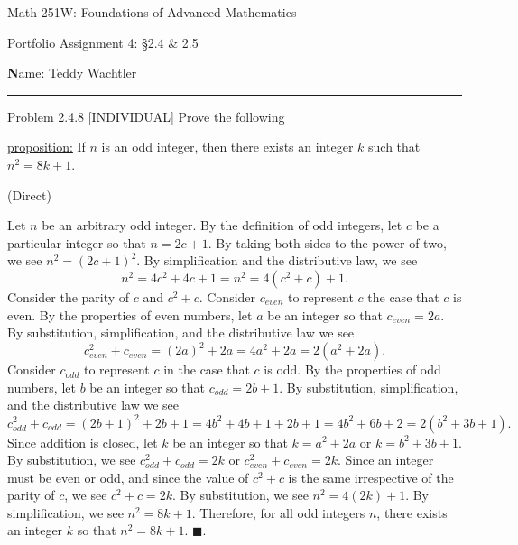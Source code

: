 \documentclass{article}
\theoremstyle{definition}
\renewcommand{\qed}{\blacksquare}
\begin{document}
	\begin{center}
		\Large{Math 251W: Foundations of Advanced Mathematics}

		\normalsize{Portfolio Assignment 4: \S 2.4 \& 2.5}

		\vspace{0.2cm}

		\hfill {\textbf Name:} Teddy Wachtler

		\vspace{0.25cm}
		\hrule
	\end{center}

	\vspace{0.3cm}


	\noindent Problem 2.4.8 [INDIVIDUAL]
	Prove the following
	\vspace{0.3cm}

	\underline{proposition:}
	If $n$ is an odd integer, then there exists an integer $k$ such that $n^2=8k+1$.

	\vspace{0.4cm}
	 (Direct)
	\vspace{0.2cm}

	Let $n$ be an arbitrary odd integer.
	By the definition of odd integers, let $c$ be a particular integer so that $n = 2c + 1$.
	By taking both sides to the power of two, we see $n^2 = (2c + 1)^2$.
	By simplification and the distributive law, we see \[n^2 = 4c^2 + 4c + 1 = n^2 = 4(c^2 + c) + 1.\]
	Consider the parity of $c$ and $c^2 + c$.
	Consider $c_{even}$ to represent $c$ the case that $c$ is even.
	By the properties of even numbers, let $a$ be an integer so that $c_{even} = 2a$.
	By substitution, simplification, and the distributive law we see \[c_{even}^2 + c_{even} = (2a)^2 + 2a = 4a^2 + 2a = 2(a^2 + 2a).\]
	Consider $c_{odd}$ to represent $c$ in the case that $c$ is odd.
	By the properties of odd numbers, let $b$ be an integer so that $c_{odd} = 2b + 1$.
	By substitution, simplification, and the distributive law we see \[c_{odd}^2 + c_{odd} = (2b + 1)^2 + 2b + 1 = 4b^2 + 4b + 1 + 2b + 1 = 4b^2 + 6b + 2 = 2(b^2 + 3b + 1).\]
	Since addition is closed, let $k$ be an integer so that $k = a^2 + 2a$ or $k = b^2 + 3b + 1$.
	By substitution, we see $c_{odd}^2 + c_{odd} = 2k$ or $c_{even}^2 + c_{even} = 2k$.
	Since an integer must be even or odd, and since the value of $c^2 + c$ is the same irrespective of the parity of $c$, we see $c^2 + c = 2k$.
	By substitution, we see $n^2 = 4(2k) + 1$.
	By simplification, we see $n^2 = 8k + 1$.
	Therefore, for all odd integers $n$, there exists an integer $k$ so that $n^2 = 8k + 1$.
	$\qed$.

	\vspace{1cm}
\end{document}
